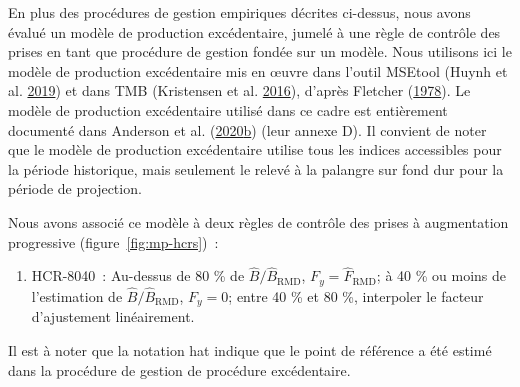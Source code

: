 \documentclass[french,11pt]{book}
\begin{document}
En plus des procédures de gestion empiriques décrites ci-dessus, nous avons évalué un modèle de production excédentaire, jumelé à une règle de contrôle des prises en tant que procédure de gestion fondée sur un modèle. Nous utilisons ici le modèle de production excédentaire mis en œuvre dans l'outil MSEtool (Huynh et al. \protect\hyperlink{ref-huynh_msetool_2019}{2019}) et dans TMB (Kristensen et al. \protect\hyperlink{ref-tmb}{2016}), d'après Fletcher (\protect\hyperlink{ref-fletcher1978}{1978}). Le modèle de production excédentaire utilisé dans ce cadre est entièrement documenté dans Anderson et al. (\protect\hyperlink{ref-anderson2020gfmp}{2020}\protect\hyperlink{ref-anderson2020gfmp}{b}) (leur annexe D). Il convient de noter que le modèle de production excédentaire utilise tous les indices accessibles pour la période historique, mais seulement le relevé à la palangre sur fond dur pour la période de projection.

Nous avons associé ce modèle à deux règles de contrôle des prises à augmentation progressive (figure~\ref{fig:mp-hcrs})~:
\begin{enumerate}
\def\labelenumi{\arabic{enumi}.}

\item
  HCR-8040~: Au-dessus de 80 \% de \(\hat{B}/\hat{B}_\textrm{RMD}\), \(F_y = \hat{F}_\textrm{RMD}\); à 40 \% ou moins de l'estimation de \(\hat{B}/\hat{B}_\textrm{RMD}\), \(F_y = 0\); entre 40 \% et 80 \%, interpoler le facteur d'ajustement linéairement.
\end{enumerate}
Il est à noter que la notation hat indique que le point de référence a été estimé dans la procédure de gestion de procédure excédentaire.
\end{document}
